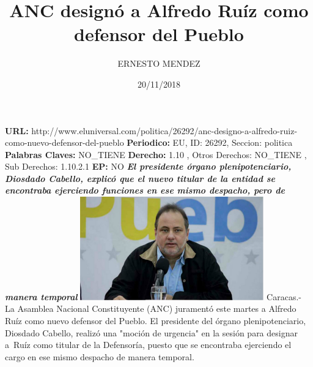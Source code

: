 \documentclass{article}%
\title{\textbf{ANC designó a Alfredo Ruíz como defensor del Pueblo}}%
\author{ERNESTO MENDEZ}%
\date{20/11/2018}%
\begin{document}
%
\normalsize%
\maketitle%
\textbf{URL: }%
http://www.eluniversal.com/politica/26292/anc{-}designo{-}a{-}alfredo{-}ruiz{-}como{-}nuevo{-}defensor{-}del{-}pueblo\newline%
%
\textbf{Periodico: }%
EU, %
ID: %
26292, %
Seccion: %
politica\newline%
%
\textbf{Palabras Claves: }%
NO\_TIENE\newline%
%
\textbf{Derecho: }%
1.10%
, Otros Derechos: %
NO\_TIENE%
, Sub Derechos: %
1.10.2.1%
\newline%
%
\textbf{EP: }%
NO\newline%
\newline%
%
\textbf{\textit{El presidente órgano plenipotenciario, Diosdado Cabello, explicó que el nuevo titular de la entidad se encontraba ejerciendo funciones en ese mismo despacho, pero de manera temporal}}%
\newline%
\newline%
%
\includegraphics[width=300px]{5.jpg}%
\newline%
%
Caracas.{-} La Asamblea Nacional Constituyente (ANC) juramentó este martes a Alfredo Ruíz como nuevo defensor del Pueblo.%
\newline%
%
El presidente del órgano plenipotenciario, Diosdado Cabello, realizó una "moción de urgencia" en la sesión para designar a~Ruíz como titular de la Defensoría, puesto que se encontraba ejerciendo el cargo en ese mismo despacho de manera temporal.%
\newline%
%
\end{document}
